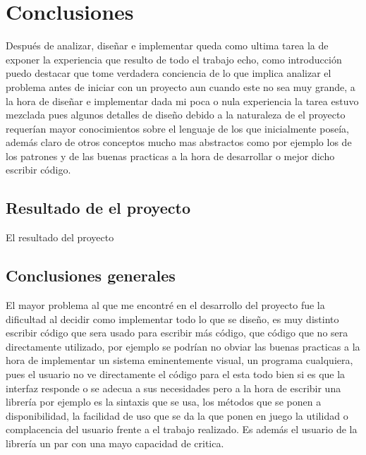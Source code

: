 \chapter{Conclusiones}
%
%
Después de analizar, diseñar e implementar queda como ultima tarea la de exponer la experiencia que resulto de todo el trabajo echo, como introducción puedo destacar que tome verdadera conciencia de lo que implica analizar el problema antes de iniciar con un proyecto aun cuando este no sea muy grande, a la hora de diseñar e implementar dada mi poca o nula experiencia la tarea estuvo mezclada pues algunos detalles de diseño debido a la naturaleza de el proyecto requerían mayor conocimientos sobre el lenguaje de los que inicialmente poseía, además claro de otros conceptos mucho mas abstractos como por ejemplo los de los patrones y de las buenas practicas a la hora de desarrollar o mejor dicho escribir código.
%
%
\section{Resultado de el proyecto}
%
El resultado del proyecto
%
\section{Conclusiones generales}    
%
El mayor problema al que me  encontré en el desarrollo del proyecto fue la dificultad al decidir como implementar todo lo que se diseño, es muy distinto escribir código que sera usado para escribir más código, que código que no sera directamente utilizado, por ejemplo se podrían no obviar las buenas practicas a la hora de implementar un sistema eminentemente visual, un programa cualquiera, pues el usuario no ve directamente el código para el esta todo bien si es que la interfaz responde o se adecua a sus necesidades pero a la hora de escribir una librería por ejemplo es la sintaxis que se usa, los métodos que se ponen a disponibilidad, la facilidad de uso que se da la que ponen en juego la utilidad o complacencia del usuario frente a el trabajo realizado. Es además el usuario de la librería un par con una mayo capacidad de critica.